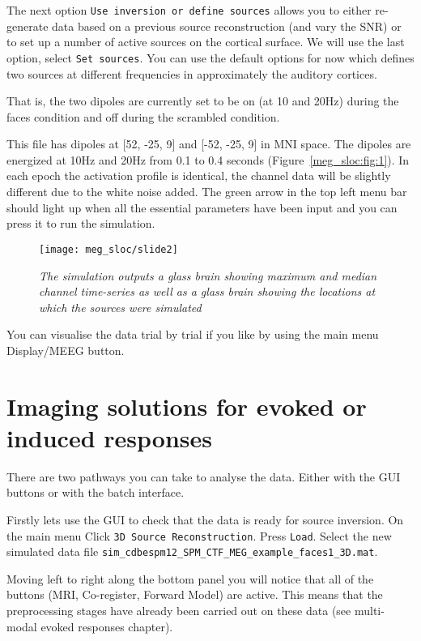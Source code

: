The next option \texttt{Use inversion or define sources} allows you to either re-generate data based on a previous source reconstruction (and vary the SNR) or to set up a number of active sources on the cortical surface. We will use the last option, select \texttt{Set sources}. You can use the default options for now which defines two sources at different frequencies in approximately the auditory cortices.

That is, the two dipoles are currently set to be on (at 10 and 20Hz) during the faces condition and off during the scrambled condition.

This file has dipoles at [52, -25, 9] and  [-52, -25, 9] in MNI space. The dipoles are energized at 10Hz and 20Hz from 0.1 to 0.4 seconds (Figure~\ref{meg_sloc:fig:1}). In each epoch the activation profile is identical, the channel data will be slightly different due to the white noise added. The green arrow in the top left menu bar should light up when all the essential parameters have been input and you can press it to run the simulation.

\begin{figure}
\begin{center}
\texttt{[image: meg\_sloc/slide2]}
\caption{\em The simulation outputs a glass brain showing maximum and median channel time-series as well as a glass brain showing the locations at which the sources were simulated } \label{meg_sloc:fig:2}
\end{center}
\end{figure}

You can visualise the data trial by trial if you like by using the main menu Display/MEEG button.
\section{Imaging solutions for evoked or induced responses}

There are two pathways you can take to analyse the data. Either with the GUI buttons or with the batch interface. 

Firstly lets use the GUI to check that the data is ready for source inversion. On the main menu Click \texttt{3D Source Reconstruction}. Press \texttt{Load}. Select the new simulated data file \texttt{sim\_cdbespm12\_SPM\_CTF\_MEG\_example\_faces1\_3D.mat}.

Moving left to right along the bottom panel you will notice that all of the buttons (MRI, Co-register, Forward Model) are active. This means that the preprocessing stages have already been carried out on these data (see multi-modal evoked responses chapter).

